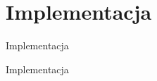 \documentclass{beamer}
\begin{document}
\section{Implementacja}

\begin{frame}{}
\begin{center}
\huge{Implementacja}
\end{center}
\end{frame}

\begin{frame}{Implementacja}
\begin{table}
     \begin{small}
	\begin{tabular}{ p{6cm} p{3cm} }
	

\end{tabular}
\end{small}
\end{table}
\end{frame}
\end{document}
